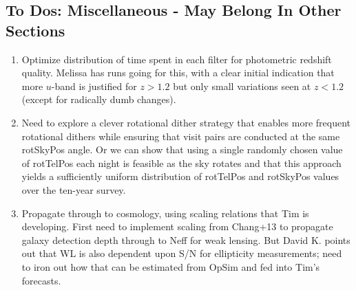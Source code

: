 \subsection{To Dos: Miscellaneous - May Belong In Other Sections}
\begin{enumerate}
\item Optimize distribution of time spent in each filter for photometric redshift quality.  Melissa has runs going for this, with a clear initial indication that more $u$-band is justified for $z>1.2$ but only small variations seen at $z<1.2$ (except for radically dumb changes).  
\item Need to explore a clever rotational dither strategy that enables more frequent rotational dithers while ensuring that visit pairs are conducted at the same rotSkyPos angle. Or we can show that using a single randomly chosen value of rotTelPos each night is feasible as the sky rotates and that this approach yields a sufficiently uniform distribution of rotTelPos and rotSkyPos values over the ten-year survey.  
\item Propagate through to cosmology, using scaling relations that Tim is developing.  First need to implement scaling from Chang+13 to propagate galaxy detection depth through to Neff for weak lensing.  But David K. points out that WL is also dependent upon S/N for ellipticity measurements; need to iron out how that can be estimated from OpSim and fed into Tim's forecasts.  
  
\end{enumerate}

 
